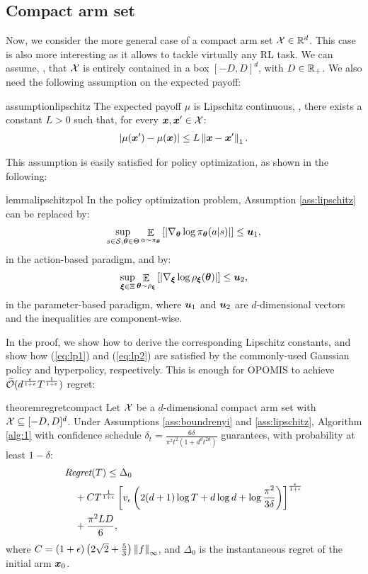 \documentclass{article}
\makeatletter
\DeclareRobustCommand{\algoname}{OPOMIS\@\xspace}
\makeatother
\begin{document}
\subsection{Compact arm set}
Now, we consider the more general case of a compact arm set $\Xspace\in\Reals^d$. This case is also more interesting as it allows to tackle virtually any RL task. We can assume, \wlg, that $\Xspace$ is entirely contained in a box $[-D,D]^d$, with $D\in\Reals_{+}$. We also need the following assumption on the expected payoff:
%
\begin{restatable}{assumption}{lipschitz}\label{ass:lipschitz}
	The expected payoff $\mu$ is Lipschitz continuous, \ie, there exists a constant $L>0$ such that, for every $\vx, \vx'\in\Xspace$:
	\begin{align*}
		|\mu(\vx') - \mu(\vx)| \leq L\norm[1]{\vx - \vx'}.
	\end{align*}
\end{restatable}
%
This assumption is easily satisfied for policy optimization, as shown in the following:
%
\begin{restatable}{lemma}{lipschitzpol}\label{lem:lispschitzpol}
	In the policy optimization problem, Assumption \ref{ass:lipschitz} can be replaced by:
	\begin{align}\label{eq:lp1}
		\sup_{s\in\Sspace,\vtheta\in\Theta}\Exp_{a\sim\pi_{\vtheta}}
		\left[\left|\nabla_{\vtheta}\log\pi_{\vtheta}(a|s)\right|\right] \leq \vu_1,
	\end{align}
	in the action-based paradigm, and by:
	\begin{align}\label{eq:lp2}
		\sup_{\vxi\in\Xi}\Exp_{\vtheta\sim\rho_{\vxi}}
		\left[\left|\nabla_{\vxi}\log\rho_{\vxi}(\vtheta)\right|\right] \leq \vu_2,
	\end{align}
	in the parameter-based paradigm, where $\vu_1$ and $\vu_2$ are $d$-dimensional vectors and the inequalities are component-wise.
\end{restatable}
%
In the proof, we show how to derive the corresponding Lipschitz constants, and show how (\ref{eq:lp1}) and (\ref{eq:lp2}) are satisfied by the commonly-used Gaussian policy and hyperpolicy, respectively. This is enough for \algoname to achieve $\wt{\mathcal{O}}(d^{\frac{\epsilon}{1+\epsilon}}T^{\frac{1}{1+\epsilon}})$ regret:
%
\begin{restatable}{theorem}{regretcompact}\label{th:regretcompact}
	Let $\Xspace$ be a $d$-dimensional compact arm set with $\Xspace \subseteq [-D,D]^d$. Under Assumptions \ref{ass:boundrenyi} and \ref{ass:lipschitz}, Algorithm \ref{alg:1} with confidence schedule $\delta_t = \frac{6\delta}{\pi^2t^2(1+d^dt^{2d})}$ guarantees, with probability at least $1-\delta$:
	\begin{align*}
	&\Reg(T) \leq \Delta_0 \\
	&\quad+ 	C
	T^{\frac{1}{1+\epsilon}}
	\left[v_{\epsilon}
	\left(2(d+1)\log T + d\log d + \log \frac{\pi^2}{3\delta}\right)
	\right]^{\frac{\epsilon}{1+\epsilon}} \\
	&\quad+ \frac{\pi^2LD}{6},
	\end{align*}
	where $C=(1+\epsilon)\left(2\sqrt{2}+\frac{5}{3}\right)\norm[\infty]{f}$, and $\Delta_0$ is the instantaneous regret of the initial arm $\vx_0$.
\end{restatable}
\end{document}
